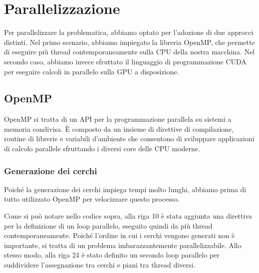\documentclass[11pt]{article}
\begin{document}
    \section{Parallelizzazione}\label{sec:parallelizzazione}
    Per parallelizzare la problematica, abbiamo optato per l'adozione di due approcci distinti.
    Nel primo scenario, abbiamo impiegato la libreria OpenMP, che permette di eseguire più thread contemporaneamente
    sulla CPU della nostra macchina.
    Nel secondo caso, abbiamo invece sfruttato il linguaggio di programmazione CUDA per eseguire calcoli in parallelo
    sulla GPU a disposizione.

    \subsection{OpenMP}\label{subsec:openmp}
    OpenMP si tratta di un API per la programmazione parallela su sistemi a memoria condivisa.
    È composto da un insieme di direttive di compilazione, routine di librerie e variabili d'ambiente che consentono di
    sviluppare applicazioni di calcolo parallele sfruttando i diversi core delle CPU moderne.\\
    \subsubsection{Generazione dei cerchi}
    Poiché la generazione dei cerchi impiega tempi molto lunghi, abbiamo prima di tutto utilizzato OpenMP per
    velocizzare questo processo.
    
    Come si può notare nello codice sopra, alla riga 10 è stata aggiunta una direttiva per la definizione di un loop
    parallelo, eseguito quindi da più thread contemporaneamente.
    Poiché l'ordine in cui i cerchi vengono generati non è importante, si tratta di un problema imbarazzantemente parallelizzabile.
    Allo stesso modo, alla riga 24 è stato definito un secondo loop parallelo per suddividere l'assegnazione tra cerchi e piani tra thread diversi.
\end{document}
